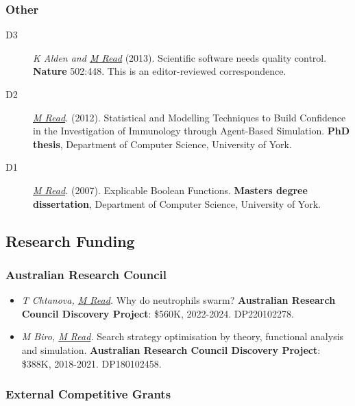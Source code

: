 \documentclass[a4paper]{article}
\begin{document}
\subsubsection*{Other}

\begin{description}
\item[D3]
\textit{K Alden and \underline{M Read}}
(2013).
Scientific software needs quality control.
\textbf{Nature} 502:448.
This is an editor-reviewed correspondence.

\item[D2]
\textit{\underline{M Read}.}
(2012).
Statistical and Modelling Techniques to Build Confidence in the Investigation of Immunology through Agent-Based Simulation.
\textbf{PhD thesis}, Department of Computer Science, University of York.

\item[D1]
\textit{\underline{M Read}.}
(2007).
Explicable Boolean Functions.
\textbf{Masters degree dissertation}, Department of Computer Science, University of York.
\end{description}

\subsection*{Research Funding}

\subsubsection*{Australian Research Council}

\begin{itemize}
    \item
    \textit{T Chtanova, \underline{M Read}.}
    Why do neutrophils swarm?
    \textbf{Australian Research Council Discovery Project}: \$560K, 2022-2024. DP220102278.
\end{itemize}

\begin{itemize}
    \item
    \textit{M Biro, \underline{M Read}.}
    Search strategy optimisation by theory, functional analysis and simulation.
    \textbf{Australian Research Council Discovery Project}: \$388K, 2018-2021. DP180102458.
\end{itemize}

\subsubsection*{External Competitive Grants}
\end{document}
